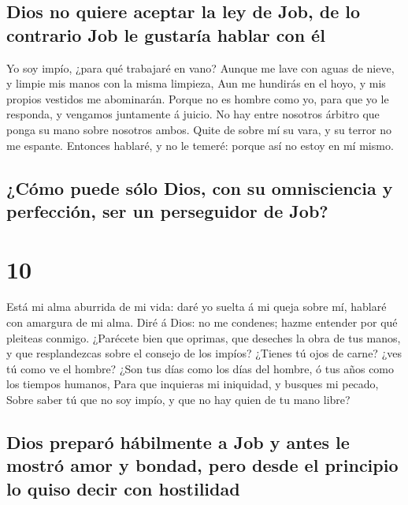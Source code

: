 \hypertarget{dios-no-quiere-aceptar-la-ley-de-job-de-lo-contrario-job-le-gustaruxeda-hablar-con-uxe9l}{%
\subsection{Dios no quiere aceptar la ley de Job, de lo contrario Job le
gustaría hablar con
él}\label{dios-no-quiere-aceptar-la-ley-de-job-de-lo-contrario-job-le-gustaruxeda-hablar-con-uxe9l}}

 Yo soy impío, ¿para qué trabajaré en vano?
 Aunque me lave con aguas de nieve, y limpie mis manos
con la misma limpieza,  Aun me hundirás en el hoyo, y mis
propios vestidos me abominarán.  Porque no es hombre como
yo, para que yo le responda, y vengamos juntamente á juicio.
 No hay entre nosotros árbitro que ponga su mano sobre
nosotros ambos.  Quite de sobre mí su vara, y su terror
no me espante.  Entonces hablaré, y no le temeré: porque
así no estoy en mí mismo.

\hypertarget{cuxf3mo-puede-suxf3lo-dios-con-su-omnisciencia-y-perfecciuxf3n-ser-un-perseguidor-de-job}{%
\subsection{¿Cómo puede sólo Dios, con su omnisciencia y perfección, ser
un perseguidor de
Job?}\label{cuxf3mo-puede-suxf3lo-dios-con-su-omnisciencia-y-perfecciuxf3n-ser-un-perseguidor-de-job}}

\hypertarget{section-18-10}{%
\section{10}\label{section-18-10}}

 Está mi alma aburrida de mi vida: daré yo suelta á mi
queja sobre mí, hablaré con amargura de mi alma.  Diré á
Dios: no me condenes; hazme entender por qué pleiteas conmigo.
 ¿Parécete bien que oprimas, que deseches la obra de tus
manos, y que resplandezcas sobre el consejo de los impíos?
 ¿Tienes tú ojos de carne? ¿ves tú como ve el hombre?
 ¿Son tus días como los días del hombre, ó tus años como
los tiempos humanos,  Para que inquieras mi iniquidad, y
busques mi pecado,  Sobre saber tú que no soy impío, y que
no hay quien de tu mano libre?

\hypertarget{dios-preparuxf3-huxe1bilmente-a-job-y-antes-le-mostruxf3-amor-y-bondad-pero-desde-el-principio-lo-quiso-decir-con-hostilidad}{%
\subsection{Dios preparó hábilmente a Job y antes le mostró amor y
bondad, pero desde el principio lo quiso decir con
hostilidad}\label{dios-preparuxf3-huxe1bilmente-a-job-y-antes-le-mostruxf3-amor-y-bondad-pero-desde-el-principio-lo-quiso-decir-con-hostilidad}}


